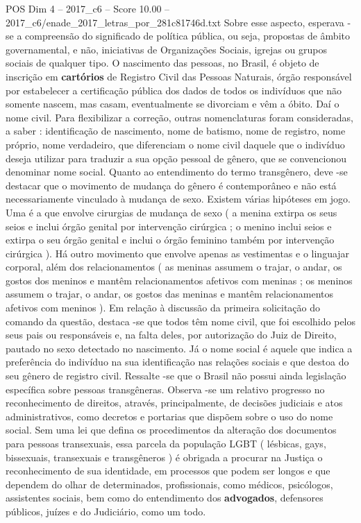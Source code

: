 \begin{textsample}{POS Dim 4 – 2017\_c6 – Score 10.00 – 2017\_c6/enade\_2017\_letras\_por\_281c81746d.txt}
Sobre esse aspecto, esperava -se a compreensão do significado de política pública, ou seja, propostas de âmbito governamental, e não, iniciativas de Organizações Sociais, igrejas ou grupos sociais de qualquer tipo.
O nascimento das pessoas, no Brasil, é objeto de inscrição em \textbf{cartórios} de Registro Civil das Pessoas Naturais, órgão responsável por estabelecer a certificação pública dos dados de todos os indivíduos que não somente nascem, mas casam, eventualmente se divorciam e vêm a óbito.
Daí o nome civil.
Para flexibilizar a correção, outras nomenclaturas foram consideradas, a saber : identificação de nascimento, nome de batismo, nome de registro, nome próprio, nome verdadeiro, que diferenciam o nome civil daquele que o indivíduo deseja utilizar para traduzir a sua opção pessoal de gênero, que se convencionou denominar nome social.
Quanto ao entendimento do termo transgênero, deve -se destacar que o movimento de mudança do gênero é contemporâneo e não está necessariamente vinculado à mudança de sexo.
Existem várias hipóteses em jogo.
Uma é a que envolve cirurgias de mudança de sexo ( a menina extirpa os seus seios e inclui órgão genital por intervenção cirúrgica ; o menino inclui seios e extirpa o seu órgão genital e inclui o órgão feminino também por intervenção cirúrgica ).
Há outro movimento que envolve apenas as vestimentas e o linguajar corporal, além dos relacionamentos ( as meninas assumem o trajar, o andar, os gostos dos meninos e mantêm relacionamentos afetivos com meninas ; os meninos assumem o trajar, o andar, os gostos das meninas e mantêm relacionamentos afetivos com meninos ).
Em relação à discussão da primeira solicitação do comando da questão, destaca -se que todos têm nome civil, que foi escolhido pelos seus pais ou responsáveis e, na falta deles, por autorização do Juiz de Direito, pautado no sexo detectado no nascimento.
Já o nome social é aquele que indica a preferência do indivíduo na sua identificação nas relações sociais e que destoa do seu gênero de registro civil.
Ressalte -se que o Brasil não possui ainda legislação específica sobre pessoas transgêneras.
Observa -se um relativo progresso no reconhecimento de direitos, através, principalmente, de decisões judiciais e atos administrativos, como decretos e portarias que dispõem sobre o uso do nome social.
Sem uma lei que defina os procedimentos da alteração dos documentos para pessoas transexuais, essa parcela da população LGBT ( lésbicas, gays, bissexuais, transexuais e transgêneros ) é obrigada a procurar na Justiça o reconhecimento de sua identidade, em processos que podem ser longos e que dependem do olhar de determinados, profissionais, como médicos, psicólogos, assistentes sociais, bem como do entendimento dos \textbf{advogados}, defensores públicos, juízes e do Judiciário, como um todo.

\end{textsample}
